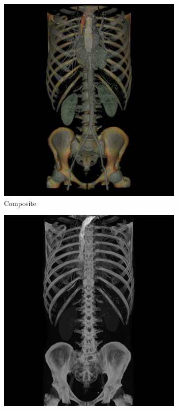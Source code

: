\begin{figure}[htbp]
  \centering
  \begin{subfigure}{.5\columnwidth}
    \includegraphics[width=\columnwidth]{TorsoBlendingComposite.png}
    \caption{Composite}
    \label{fig:blendcomposite}
  \end{subfigure}%
  \begin{subfigure}{.5\columnwidth}
    \includegraphics[width=\columnwidth]{TorsoBlendingMIP.png}

\end{subfigure}
\end{figure}
